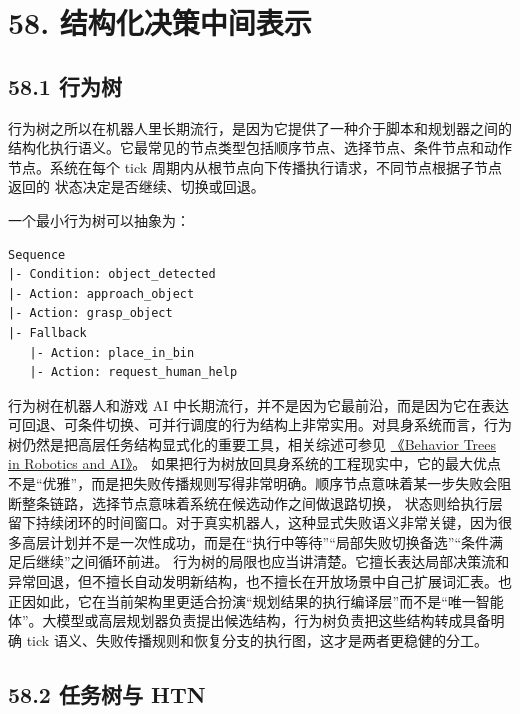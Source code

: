\section*{58. 结构化决策中间表示}

\subsection*{58.1 行为树}


行为树之所以在机器人里长期流行，是因为它提供了一种介于脚本和规划器之间的结构化执行语义。它最常见的节点类型包括顺序节点、选择节点、条件节点和动作节点。系统在每个 tick 周期内从根节点向下传播执行请求，不同节点根据子节点返回的  状态决定是否继续、切换或回退。

一个最小行为树可以抽象为：

\begin{lstlisting}
Sequence
|- Condition: object_detected
|- Action: approach_object
|- Action: grasp_object
|- Fallback
   |- Action: place_in_bin
   |- Action: request_human_help
\end{lstlisting}

行为树在机器人和游戏 AI 中长期流行，并不是因为它最前沿，而是因为它在表达可回退、可条件切换、可并行调度的行为结构上非常实用。对具身系统而言，行为树仍然是把高层任务结构显式化的重要工具，相关综述可参见 \href{https://arxiv.org/abs/1709.00084}{《Behavior Trees in Robotics and AI》}。 如果把行为树放回具身系统的工程现实中，它的最大优点不是“优雅”，而是把失败传播规则写得非常明确。顺序节点意味着某一步失败会阻断整条链路，选择节点意味着系统在候选动作之间做退路切换，\texttt{} 状态则给执行层留下持续闭环的时间窗口。对于真实机器人，这种显式失败语义非常关键，因为很多高层计划并不是一次性成功，而是在“执行中等待”“局部失败切换备选”“条件满足后继续”之间循环前进。 行为树的局限也应当讲清楚。它擅长表达局部决策流和异常回退，但不擅长自动发明新结构，也不擅长在开放场景中自己扩展词汇表。也正因如此，它在当前架构里更适合扮演“规划结果的执行编译层”而不是“唯一智能体”。大模型或高层规划器负责提出候选结构，行为树负责把这些结构转成具备明确 tick 语义、失败传播规则和恢复分支的执行图，这才是两者更稳健的分工。

\subsection*{58.2 任务树与 HTN}


